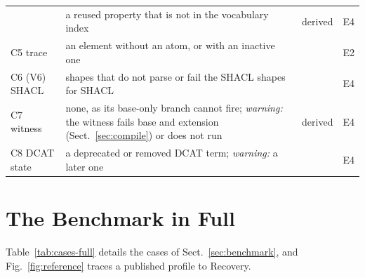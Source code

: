 \begin{table}[tp]
\begin{tabular}{@{}>{\raggedright\arraybackslash}p{2.08cm}>{\raggedright\arraybackslash}p{8.29cm}%
      >{\raggedright\arraybackslash}p{0.9cm}>{\raggedright\arraybackslash}p{0.5cm}@{}}
      & a reused property that is not in the vocabulary index
      & derived & E4\\
    C5 trace %
      & an element without an atom, or with an inactive one
      & \cite{semicreuse2026} & E2\\
    C6 (V6) SHACL %
      & shapes that do not parse or fail the SHACL shapes for SHACL
      & \cite{w3cshacl} & E4\\
    C7 witness %
      & none, as its base-only branch cannot fire; \emph{warning:} the witness fails base and extension
        (Sect.~\ref{sec:compile}) or does not run
      & derived & E4\\
    C8 DCAT state %
      & a deprecated or removed DCAT term; \emph{warning:} a later one
      & \cite[\S4]{w3cdcat3} & E4\\ %
    \bottomrule
  \end{tabular}
\end{table}

\section{The Benchmark in Full}\label{app:benchmark}

Table~\ref{tab:cases-full} details the cases of Sect.~\ref{sec:benchmark}, and Fig.~\ref{fig:reference} traces a
published profile to Recovery. 

